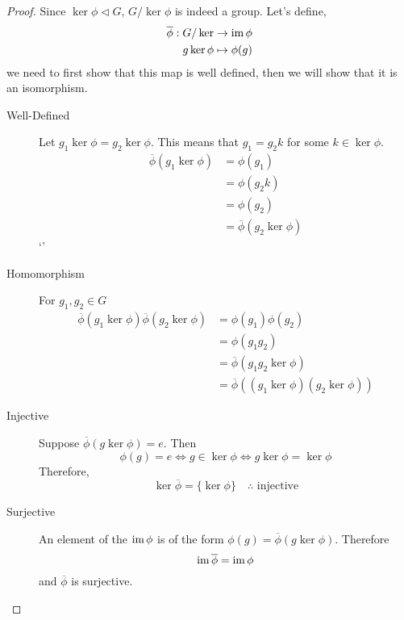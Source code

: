 \documentclass{article}
\begin{document}
\begin{proof}
    Since $\ker \phi \triangleleft G$, $G / \ker \phi$ is indeed a group. Let's define,
    \begin{align*}
        \overline{\phi}: G / \ker &\rightarrow \operatorname{im} \phi \\
        g\ker \phi &\mapsto \phi(g)
    \end{align*}
    we need to first show that this map is well defined, then we will show that it is an isomorphism.
    \begin{description}
        \item[Well-Defined] Let $g_1 \ker \phi = g_2 \ker \phi$. This means that $g_1 = g_2k$ for some $k \in \ker \phi$.
        \begin{align*}
            \overline{\phi}(g_1 \ker \phi) &= \phi(g_1) \\
            &= \phi(g_2k) \\
            &= \phi(g_2) \\
            &= \overline{\phi}(g_2 \ker \phi)
        \end{align*}`'
        \item[Homomorphism] For $g_1, g_2 \in G$
        \begin{align*}
            \overline{\phi}(g_1 \ker \phi)\overline{\phi}(g_2 \ker \phi) &= \phi(g_1)\phi(g_2)\\
            &=\phi(g_1g_2) \\
            &= \overline{\phi}(g_1g_2 \ker \phi) \\
            &= \overline{\phi}((g_1 \ker \phi)(g_2 \ker \phi))
        \end{align*}
        \item[Injective] Suppose $\overline{\phi}(g \ker \phi) = e$. Then
        \[
            \phi(g) = e \iff g \in \ker \phi \iff g \ker \phi = \ker \phi
        \]
        Therefore, 
        \[
            \ker \overline{\phi} = \{ \ker \phi \} \quad \therefore \text{ injective}  
        \]
        \item[Surjective] An element of the $\operatorname{im} \phi$ is of the form $\phi(g) = \overline{\phi}(g \ker\phi)$. Therefore
        \[
            \operatorname{im} \overline{\phi} = \operatorname{im} \phi  
        \]
        and $\overline{\phi}$ is surjective.
    \end{description}
\end{proof}
\end{document}
